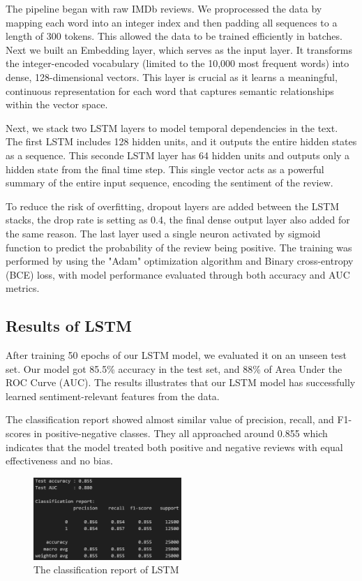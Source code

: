 The pipeline began with raw IMDb reviews. We proprocessed the data by mapping each word into an integer index and then padding all sequences to a length of 300 tokens. This allowed the data to be trained efficiently in batches. Next we built an Embedding layer, which serves as the input layer. It transforms the integer-encoded vocabulary (limited to the 10,000 most frequent words) into dense, 128-dimensional vectors. This layer is crucial as it learns a meaningful, continuous representation for each word that captures semantic relationships within the vector space.

Next, we stack two LSTM layers to model temporal dependencies in the text. The first LSTM includes 128 hidden units, and it outputs the entire hidden states as a sequence. This seconde LSTM layer has 64 hidden units and outputs only a hidden state from the final time step. This single vector acts as a powerful summary of the entire input sequence, encoding the sentiment of the review.

To reduce the risk of overfitting, dropout layers are added between the LSTM stacks, the drop rate is setting as 0.4, the final dense output layer also added for the same reason. The last layer used a single neuron activated by sigmoid function to predict the probability of the review being positive. The training was performed by using the "Adam" optimization algorithm and Binary cross-entropy (BCE) loss, with model performance evaluated through both accuracy and AUC metrics.

\subsection{Results of LSTM}
After training 50 epochs of our LSTM model, we evaluated it on an unseen test set. Our model got 85.5\% accuracy in the test set, and 88\% of Area Under the ROC Curve (AUC). The results illustrates that our LSTM model has successfully learned sentiment-relevant features from the data.

The classification report showed almost similar value of precision, recall, and F1-scores in positive-negative classes. They all approached around 0.855 which indicates that the model treated both positive and negative reviews with equal effectiveness and no bias.

\begin{figure}[ht]
    \centering
    \includegraphics[width=0.5\textwidth]{pics/lstm_report.png}
    \caption{The classification report of LSTM}
\end{figure}

